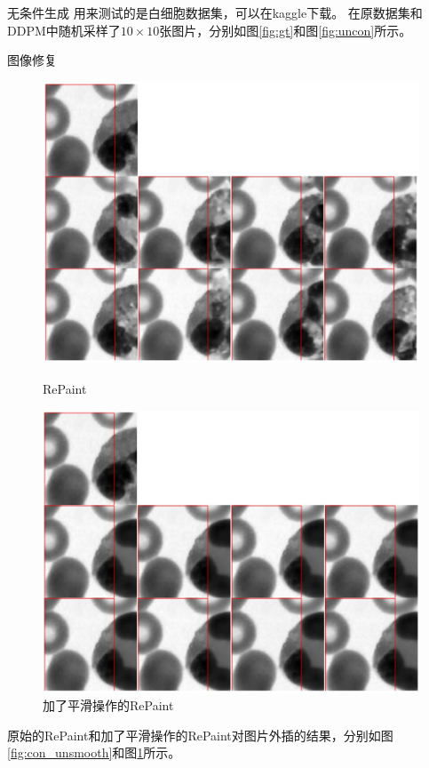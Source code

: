 \documentclass[10pt]{beamer}
\begin{document}
\begin{frame}[fragile]{无条件生成}
  用来测试的是白细胞数据集\cite{kouzehkananLargeDatasetWhite2022}，可以在kaggle下载。
  在原数据集和DDPM中随机采样了$10 \times 10$张图片，分别如图\ref{fig:gt}和图\ref{fig:uncon}所示。
\end{frame}

\begin{frame}[fragile]{图像修复}
  \begin{figure}[htbp]
    \centering
    \begin{minipage}[t]{0.49\textwidth}
    \centering
    \includegraphics[width=1\linewidth]{imgs/con_unsmooth.jpg}
    \caption{RePaint}
    \label{fig:con_unsmooth}
    \end{minipage}
    \begin{minipage}[t]{0.49\textwidth}
    \centering
    \includegraphics[width=1\linewidth]{imgs/con_smooth.jpg}
    \caption{加了平滑操作的RePaint}
    \label{fig:con_smooth}
    \end{minipage}
    \end{figure}

  原始的RePaint和加了平滑操作的RePaint对图片外插的结果，分别如图\ref{fig:con_unsmooth}和图\ref{fig:con_smooth}所示。
\end{frame}
\end{document}
